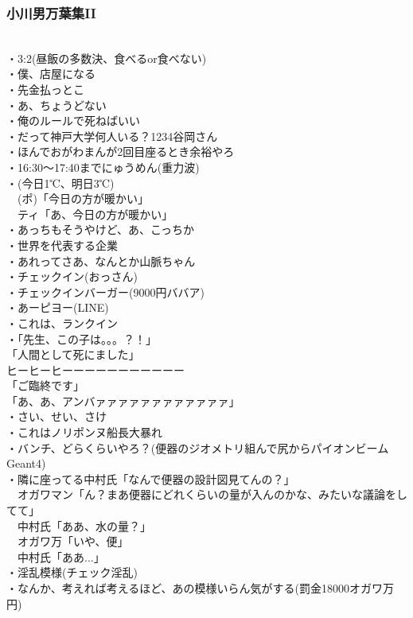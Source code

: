 \documentclass[12pt]{jsarticle}
\begin{document}
\subsubsection{小川男万葉集II}
　\\
・3:2(昼飯の多数決、食べるor食べない)\\
・僕、店屋になる\\
・先金払っとこ\\
・あ、ちょうどない\\
・俺のルールで死ねばいい\\
・だって神戸大学何人いる？1234谷岡さん\\
・ほんでおがわまんが2回目座るとき余裕やろ\\
・16:30〜17:40までにゅうめん(重力波)\\
・(今日1℃、明日3℃)\\
　(ポ)「今日の方が暖かい」\\
　ティ「あ、今日の方が暖かい」\\
・あっちもそうやけど、あ、こっちか\\
・世界を代表する企業\\
・あれってさあ、なんとか山脈ちゃん\\
・チェックイン(おっさん)\\
・チェックインバーガー(9000円ババア)\\
・あーピヨー(LINE)\\
・これは、ランクイン\\
・「先生、この子は。。。？！」\\
 「人間として死にました」\\
 ヒーヒーヒーーーーーーーーーーー\\
 「ご臨終です」\\
 「あ、あ、アンバァァァァァァァァァァァァ」\\
・さい、せい、さけ\\
・これはノリポンヌ船長大暴れ\\
・バンチ、どらくらいやろ？(便器のジオメトリ組んで尻からパイオンビームGeant4)\\
・隣に座ってる中村氏「なんで便器の設計図見てんの？」\\
 　オガワマン「ん？まあ便器にどれくらいの量が入んのかな、みたいな議論をしてて」\\
 　中村氏「ああ、水の量？」\\
 　オガワ万「いや、便」\\
 　中村氏「ああ...」\\
・淫乱模様(チェック淫乱)\\
・なんか、考えれば考えるほど、あの模様いらん気がする(罰金18000オガワ万円)\\
\end{document}
